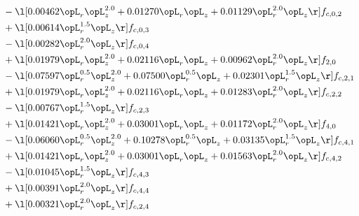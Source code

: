 \begin{alignat}{2}
& - \l[  0.00462 \opL_r \opL_z^{2.0} +  0.01270 \opL_r \opL_z +  0.01129 \opL_r^{2.0} \opL_z  \r] f_{c,0,2} \nonumber \\ 
& + \l[  0.00614 \opL_r^{1.5} \opL_z  \r] f_{c,0,3} \nonumber \\ 
& - \l[  0.00282 \opL_r^{2.0} \opL_z  \r] f_{c,0,4} \nonumber \\ 
& + \l[  0.01979 \opL_r \opL_z^{2.0} +  0.02116 \opL_r \opL_z +  0.00962 \opL_r^{2.0} \opL_z  \r] f_{2,0} \nonumber \\ 
& - \l[  0.07597 \opL_r^{0.5} \opL_z^{2.0} +  0.07500 \opL_r^{0.5} \opL_z +  0.02301 \opL_r^{1.5} \opL_z  \r] f_{c,2,1} \nonumber \\ 
& + \l[  0.01979 \opL_r \opL_z^{2.0} +  0.02116 \opL_r \opL_z +  0.01283 \opL_r^{2.0} \opL_z  \r] f_{c,2,2} \nonumber \\ 
& - \l[  0.00767 \opL_r^{1.5} \opL_z  \r] f_{c,2,3} \nonumber \\ 
& + \l[  0.01421 \opL_r \opL_z^{2.0} +  0.03001 \opL_r \opL_z +  0.01172 \opL_r^{2.0} \opL_z  \r] f_{4,0} \nonumber \\ 
& - \l[  0.06060 \opL_r^{0.5} \opL_z^{2.0} +  0.10278 \opL_r^{0.5} \opL_z +  0.03135 \opL_r^{1.5} \opL_z  \r] f_{c,4,1} \nonumber \\ 
& + \l[  0.01421 \opL_r \opL_z^{2.0} +  0.03001 \opL_r \opL_z +  0.01563 \opL_r^{2.0} \opL_z  \r] f_{c,4,2} \nonumber \\ 
& - \l[  0.01045 \opL_r^{1.5} \opL_z  \r] f_{c,4,3} \nonumber \\ 
& + \l[  0.00391 \opL_r^{2.0} \opL_z  \r] f_{c,4,4} \nonumber \\ 
& + \l[  0.00321 \opL_r^{2.0} \opL_z  \r] f_{c,2,4} \nonumber \\ 
\end{alignat} 



